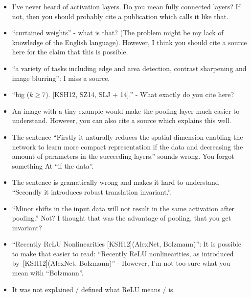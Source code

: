 \documentclass[a4paper,9pt]{scrartcl}
\begin{document}
\begin{itemize}
    \item I've never heard of activation layers. Do you mean fully connected
          layers? If not, then you should probably cite a publication which
          calls it like that.
    \item \enquote{curtained weights} - what is that? (The problem might be
          my lack of knowledge of the English language). However, I think
          you should cite a source here for the claim that this is possible.
    \item \enquote{a variety of tasks including edge and area detection,
    contrast sharpening and image blurring}: I miss a source.
    \item \enquote{big ($k \geq 7$). [KSH12, SZ14, SLJ + 14].} - What exactly
          do you cite here?
    \item An image with a tiny example would make the pooling layer much
          easier to understand. However, you can also cite a source which
          explains this well.
    \item The sentence \enquote{Firstly it naturally reduces the spatial dimension
enabling the network to learn more compact representation if the data and decreasing the
amount of parameters in the succeeding layers.} sounds wrong. You forgot something
          At \enquote{if the data}.
    \item The sentence is gramatically wrong and makes it hard to understand
          \enquote{Secondly it introduces robust translation invariant.}.
    \item \enquote{Minor shifts in the input data will not result in the same activation after pooling.}
          Not? I thought that was the advantage of pooling, that you get
          invariant?
    \item \enquote{Recently ReLU Nonlinearities [KSH12](AlexNet, Bolzmann)}:
          It is possible to make that easier to read:
          \enquote{Recently ReLU nonlinearities, as introduced by~[KSH12](AlexNet, Bolzmann)}
          - However, I'm not too sure what you mean with \enquote{Bolzmann}.
    \item It was not explained / defined what ReLU means / is.
\end{itemize}
\end{document}
